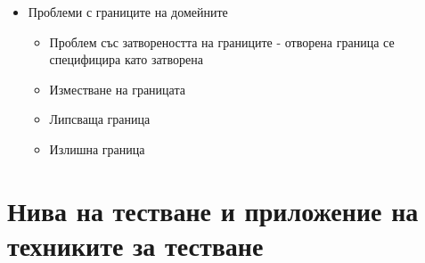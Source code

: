 \documentclass[fleqn,12pt]{article}
\begin{document}
\begin{flushleft}
\begin{itemize}
\begin{itemize}
                \end{itemize}
            \item Проблеми с границите на домейните
                \begin{itemize}
                    \item Проблем със затвореността на границите - отворена граница се специфицира като затворена
                    \item Изместване на границата
                    \item Липсваща граница
                    \item Излишна граница
                \end{itemize}
        \end{itemize}
\section{Нива на тестване и приложение на техниките за тестване}

\end{flushleft}
\end{document}
